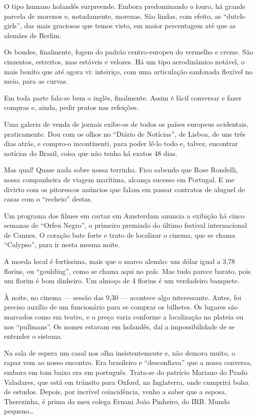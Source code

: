 O tipo humano holandês surpreende. Embora predominando o louro, há grande parcela de morenos e, notadamente, morenas. São lindas, com efeito, as ``dutch-girls'', das mais graciosas que temos visto, em maior percentagem até que as alemães de Berlim.

Os bondes, finalmente, fogem do padrão centro-europeu do vermelho e creme. São cinzentos, estreitos, mas estáveis e velozes. Há um tipo aerodinâmico notável, o mais bonito que até agora vi: inteiriço, com uma articulação sanfonada flexível no meio, para as curvas.

Em toda parte fala-se bem o inglês, finalmente. Assim é fácil conversar e fazer compras e, ainda, pedir pratos nas refeições.

Uma galeria de venda de jornais exibe-os de todos os países europeus ocidentais, praticamente. Dou com os olhos no ``Diário de Notícias'', de Lisboa, de uns três dias atrás, e compro-o incontinenti, para poder lê-lo todo e, talvez, encontrar notícias do Brasil, coisa que não tenho há exatos 48 dias.

Mas qual! Quase nada sobre nossa terrinha. Fico sabendo que Rose Rondelli, nossa companheira de viagem marítima, alcança sucesso em Portugal. E me divirto com os pitorescos anúncios que falam em passar contratos de aluguel de casas com o ``recheio'' destas.

Um programa dos filmes em cartaz em Amsterdam anuncia a exibição há cinco semanas de ``Orfeu Negro'', o primeiro premiado do último festival internacional de Cannes. O coração bate forte e trato de localizar o cinema, que se chama ``Calypso'', para ir nesta mesma noite.

A moeda local é fortíssima, mais que o marco alemão: um dólar igual a 3,78 florins, ou ``goulding'', como se chama aqui no país. Mas tudo parece barato, pois um florim é bom dinheiro. Um almoço de 4 florins é um verdadeiro banquete.

À noite, no cinema --- sessão das 9,30 --- acontece algo interessante. Antes, foi preciso auxílio de um funcionário para se comprar os bilhetes. Os lugares são marcados como em teatro, e o preço varia conforme a localização na plateia ou nos ``pullmans''. Os nomes estavam em holandês, daí a impossibilidade de se entender o sistema.

Na sala de espera um casal nos olha insistentemente e, não demora muito, o rapaz vem ao nosso encontro. Era brasileiro e ``desconfiava'' que a nossa conversa, embora em tom baixo era em português. Trata-se do patrício Mariano do Prado Valadares, que está em trânsito para Oxford, na Inglaterra, onde cumprirá bolsa de estudos. Depois, por incrível coincidência, venho a saber que a esposa, Therezinha, é prima do meu colega Ernani João Pinheiro, do IRB. Mundo pequeno\ldots

